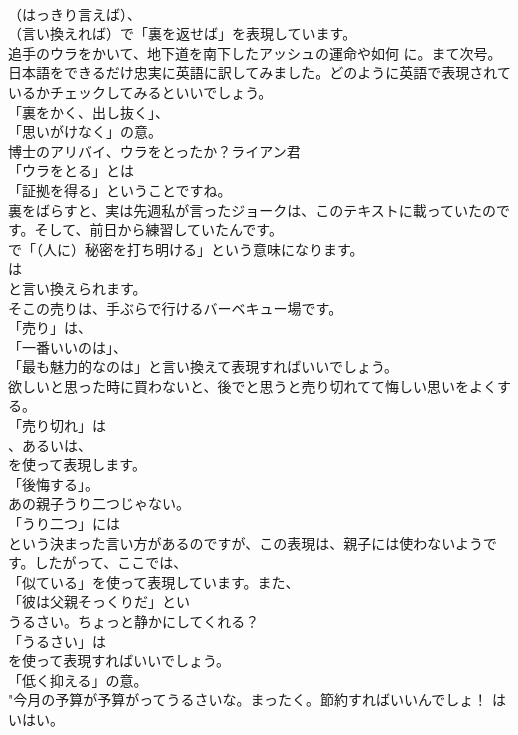 \documentclass[8pt]{extreport}
\begin{document}
\begin{CJK}{UTF8}{min}
\\	（はっきり言えば）、
\\	（言い換えれば）で「裏を返せば」を表現しています。	
\\	追手のウラをかいて、地下道を南下したアッシュの運命や如何 に。まて次号。 
\\	日本語をできるだけ忠実に英語に訳してみました。どのように英語で表現されているかチェックしてみるといいでしょう。
\\	「裏をかく、出し抜く」、
\\	「思いがけなく」の意。	
\\	博士のアリバイ、ウラをとったか？ライアン君 
\\	「ウラをとる」とは
\\	「証拠を得る」ということですね。	
\\	裏をばらすと、実は先週私が言ったジョークは、このテキストに載っていたのです。そして、前日から練習していたんです。 
\\	で「（人に）秘密を打ち明ける」という意味になります。
\\	は 
\\	と言い換えられます。	
\\	そこの売りは、手ぶらで行けるバーベキュー場です。 
\\	「売り」は、
\\	「一番いいのは」、
\\	「最も魅力的なのは」と言い換えて表現すればいいでしょう。	
\\	欲しいと思った時に買わないと、後でと思うと売り切れてて悔しい思いをよくする。 
\\	「売り切れ」は
\\	、あるいは、
\\	を使って表現します。
\\	「後悔する」。	
\\	あの親子うり二つじゃない。 
\\	「うり二つ」には
\\	という決まった言い方があるのですが、この表現は、親子には使わないようです。したがって、ここでは、
\\	「似ている」を使って表現しています。また、
\\	「彼は父親そっくりだ」とい	
\\	うるさい。ちょっと静かにしてくれる？ 
\\	「うるさい」は
\\	を使って表現すればいいでしょう。
\\	「低く抑える」の意。	
\\	"今月の予算が予算がってうるさいな。まったく。節約すればいいんでしょ！ はいはい。 

\end{CJK}
\end{document}
